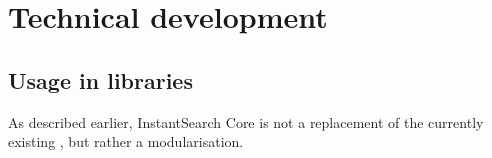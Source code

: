 
\chapter{Technical development} %
\label{chp:execution}








\section{Usage in libraries} %
\label{sec:usage_in_libraries}

As described earlier, InstantSearch Core\cite{is-core} is not a replacement of the currently existing , but rather a modularisation. 


